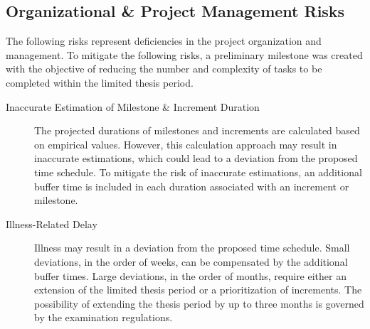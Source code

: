 \subsection{Organizational \& Project Management Risks}
\label{sec:risk_assessment_project_management}
The following risks represent deficiencies in the project organization and management.
To mitigate the following risks, a preliminary milestone was created with the objective of reducing the number and complexity of tasks to be completed within the limited thesis period.
\begin{description}
    \item[Inaccurate Estimation of Milestone \& Increment Duration] The projected durations of milestones and increments are calculated based on empirical values.
    However, this calculation approach may result in inaccurate estimations, which could lead to a deviation from the proposed time schedule.
    To mitigate the risk of inaccurate estimations, an additional buffer time is included in each duration associated with an increment or milestone.
    \item[Illness-Related Delay] Illness may result in a deviation from the proposed time schedule.
    Small deviations, in the order of weeks, can be compensated by the additional buffer times.
    Large deviations, in the order of months, require either an extension of the limited thesis period or a prioritization of increments.
    The possibility of extending the thesis period by up to three months is governed by the examination regulations.
\end{description}
